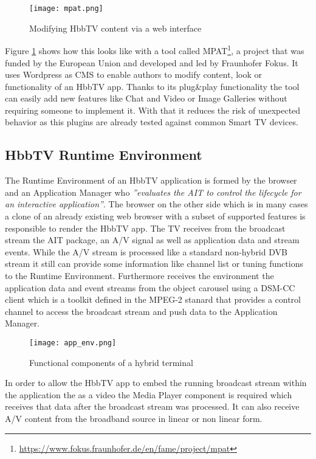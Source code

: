 \begin{figure}[htb]
  \centering
  \texttt{[image: mpat.png]}\\
  \caption{
    Modifying HbbTV content via a web interface
  }
  \label{fig:mpat}
\end{figure}

Figure \ref{fig:mpat} shows how this looks like with a tool called MPAT\footnote{\url{https://www.fokus.fraunhofer.de/en/fame/project/mpat}},
a project that was funded by the European Union and developed and led by Fraunhofer Fokus.
It uses Wordpress as CMS to enable authors to modify content, look or functionality of an HbbTV
app. Thanks to its plug\&play functionality the tool can easily add new features like Chat and Video or
Image Galleries without requiring someone to implement it. With that it reduces the risk of unexpected
behavior as this plugins are already tested against common Smart TV devices.

\subsection{HbbTV Runtime Environment\label{sec:hbbtvruntimeenvironment}}

The Runtime Environment of an HbbTV application is formed by the browser and an Application Manager who
\textit{''evaluates the AIT to control the lifecycle for an interactive application''}\cite{hbbtv15}.
The browser on the other side which is in many cases a clone of an already existing web browser with
a subset of supported features is responsible to render the HbbTV app. The TV receives from the broadcast
stream the AIT package, an A/V signal as well as application data and stream events. While the A/V
stream is processed like a standard non-hybrid DVB stream it still can provide some information like
channel list or tuning functions to the Runtime Environment. Furthermore receives the environment
the application data and event streams from the object carousel using a DSM-CC client which is a
toolkit defined in the MPEG-2 stanard that provides a control channel to access the broadcast stream
and push data to the Application Manager.

\begin{figure}[htb]
  \centering
  \texttt{[image: app\_env.png]}\\
  \caption{
    Functional components of a hybrid terminal
  }
  \label{fig:app_env}
\end{figure}

In order to allow the HbbTV app to embed the running broadcast stream within the application the
as a video the Media Player component is required which receives that data after the broadcast
stream was processed. It can also receive A/V content from the broadband source in linear or non
linear form.

